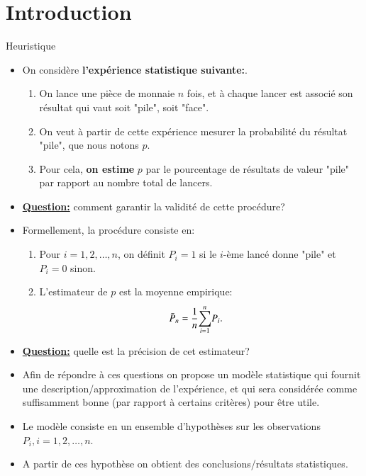 \section{Introduction}
\frame{\sectionpage}

\begin{frame}[allowframebreaks]{Heuristique}
\begin{itemize}
    \item On considère \textbf{l'expérience statistique suivante:}.
    \begin{enumerate}[-]
        \item On lance une pièce de monnaie $n$ fois, et à chaque lancer est associé 
    son résultat qui vaut soit "pile", soit "face".
        \item On veut à partir de cette expérience mesurer la probabilité du résultat "pile", que nous notons $p$.
        \item Pour cela, \textbf{on estime} $p$ par le pourcentage de résultats de valeur "pile" par rapport au nombre total de lancers.
     \end{enumerate}
    \item \textbf{\underline{Question:}} comment garantir la validité de cette procédure?

\framebreak

    \item Formellement, la procédure consiste en:
    \begin{enumerate}[-]
    \item Pour $i=1, 2, \ldots, n$, on définit $P_i = 1$ si le $i$-ème lancé donne "pile" et $P_i=0$ sinon.
    \item L'estimateur de $p$ est la moyenne empirique:
    \begin{align*}
        \bar{P}_n &=\frac{1}{n}{\sum_{i=1}^n} P_i.
    \end{align*}
    \end{enumerate}
    \item \textbf{\underline{Question:}} quelle est la précision de cet estimateur?
    \item Afin de répondre à ces questions on propose un modèle statistique qui fournit une description/approximation de l'expérience, et qui sera considérée comme suffisamment bonne
    (par rapport à certains critères) pour être utile.
    \framebreak

    \item Le modèle consiste en un ensemble  d'hypothèses sur les 
     observations $P_i, i=1, 2, \ldots, n$.
     \item  A partir de ces hypothèse on obtient des conclusions/résultats statistiques.


\end{itemize}
\end{frame}
